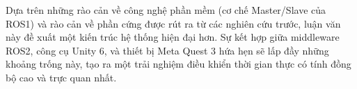 Dựa trên những rào cản về công nghệ phần mềm (cơ chế Master/Slave của ROS1) và rào cản về phần cứng được rút ra từ các nghiên cứu trước, luận văn này đề xuất một kiến trúc hệ thống hiện đại hơn. Sự kết hợp giữa middleware ROS2, công cụ Unity 6, và thiết bị Meta Quest 3 hứa hẹn sẽ lấp đầy những khoảng trống này, tạo ra một trải nghiệm điều khiển thời gian thực có tính đồng bộ cao và trực quan nhất.
